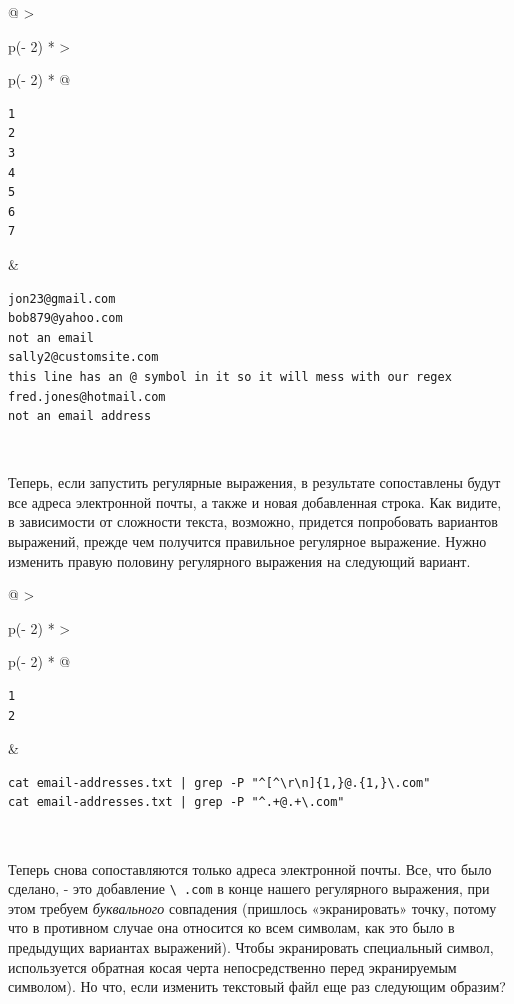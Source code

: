 \documentclass{article}
\begin{document}
\begin{longtable}[]{@{}
  >{\raggedright\arraybackslash}p{(\columnwidth - 2\tabcolsep) * }
  >{\raggedright\arraybackslash}p{(\columnwidth - 2\tabcolsep) * }@{}}
\toprule
\endhead
\begin{minipage}[t]{\linewidth}\raggedright
\begin{verbatim}
1
2
3
4
5
6
7
\end{verbatim}
\end{minipage} & \begin{minipage}[t]{\linewidth}\raggedright
\begin{verbatim}
jon23@gmail.com
bob879@yahoo.com
not an email
sally2@customsite.com
this line has an @ symbol in it so it will mess with our regex
fred.jones@hotmail.com
not an email address
\end{verbatim}
\end{minipage} \\ \addlinespace
\bottomrule
\end{longtable}

Теперь, если запустить регулярные выражения, в результате сопоставлены
будут все адреса электронной почты, а также и новая добавленная строка.
Как видите, в зависимости от сложности текста, возможно, придется
попробовать вариантов выражений, прежде чем получится правильное
регулярное выражение. Нужно изменить правую половину регулярного
выражения на следующий вариант.

\begin{longtable}[]{@{}
  >{\raggedright\arraybackslash}p{(\columnwidth - 2\tabcolsep) * }
  >{\raggedright\arraybackslash}p{(\columnwidth - 2\tabcolsep) * }@{}}
\toprule
\endhead
\begin{minipage}[t]{\linewidth}\raggedright
\begin{verbatim}
1
2
\end{verbatim}
\end{minipage} & \begin{minipage}[t]{\linewidth}\raggedright
\begin{verbatim}
cat email-addresses.txt | grep -P "^[^\r\n]{1,}@.{1,}\.com"
cat email-addresses.txt | grep -P "^.+@.+\.com"
\end{verbatim}
\end{minipage} \\ \addlinespace
\bottomrule
\end{longtable}

Теперь снова сопоставляются только адреса электронной почты. Все, что
было сделано, - это добавление \texttt{\textbackslash{}\ .com} в конце
нашего регулярного выражения, при этом требуем \emph{буквального}
совпадения (пришлось «экранировать» точку, потому что в противном случае
она относится ко всем символам, как это было в предыдущих вариантах
выражений). Чтобы экранировать специальный символ, используется обратная
косая черта непосредственно перед экранируемым символом). Но что, если
изменить текстовый файл еще раз следующим образим?
\end{document}

